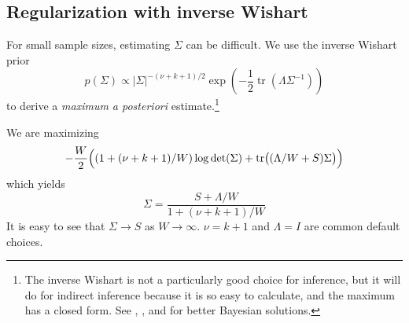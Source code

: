 \documentclass[b5paper,11pt]{article}
\DeclareMathOperator{\tr}{tr}
\begin{document}
\subsection{Regularization with inverse Wishart}
\label{sec:regul-with-inverse}

For small sample sizes, estimating $\Sigma$ can be difficult. We use the inverse Wishart prior
\begin{equation}
  p(\Sigma) \propto |\Sigma|^{-(\nu+k+1)/2} \exp\left(-\frac12 \tr(\Lambda \Sigma^{-1}) \right)
\end{equation}
to derive a \emph{maximum a posteriori} estimate.\footnote{The inverse Wishart is not a particularly good choice for inference, but it will do for indirect inference because it is so easy to calculate, and the maximum has a closed form. See \textcite{chung2015weakly}, \textcite{barnard2000modeling}, and \textcite{alvarez2014bayesian} for better Bayesian solutions.}

We are maximizing
\begin{equation}
  -\frac{W}2\Bigl( (1+(\nu+k+1)/W) \log\det(\Sigma) +
    \tr\bigl((\Lambda/W + S)\Sigma\bigr)\Bigr)
\end{equation}
which yields
\begin{equation}
  \Sigma = \frac{S + \Lambda/W}{1+(\nu+k+1)/W}
\end{equation}
It is easy to see that $\Sigma \to S$ as $W \to \infty$. $\nu = k+1$ and $\Lambda=I$ are common default choices.

\printbibliography
\end{document}
